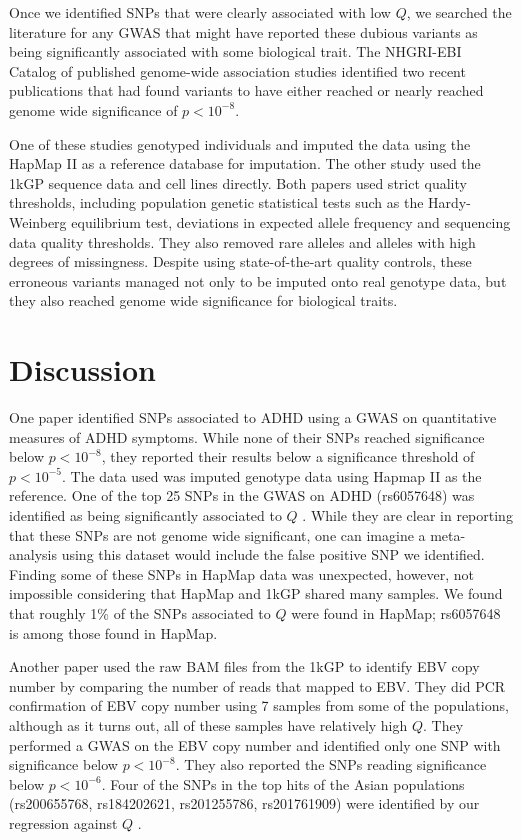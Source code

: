 \documentclass[9pt,lineno]{elife}
\begin{document}
Once we identified SNPs that were clearly associated with low $Q$, we searched the literature for any GWAS that might have reported these dubious variants as being significantly associated with some biological trait. 
The NHGRI-EBI Catalog of published genome-wide association studies identified two recent publications that had found variants to have either reached or nearly reached genome wide significance of $ p < 10^{-8}$.

One of these studies genotyped individuals and imputed the data using the HapMap II as a reference  database for imputation.
The other study used the 1kGP sequence data and cell lines directly.
Both papers used strict quality thresholds, including population genetic statistical tests such as the Hardy-Weinberg equilibrium test, deviations in expected allele frequency and sequencing data quality thresholds. 
They also removed rare alleles and alleles with high degrees of missingness. 
Despite using state-of-the-art quality controls, these erroneous variants managed not only to be imputed onto real genotype data, but they also reached genome wide significance for biological traits.

\section{Discussion}
One paper identified SNPs associated to ADHD using a GWAS on quantitative measures of ADHD symptoms.
While none of their SNPs reached significance below $ p < 10^{-8}$, they reported their results below a significance threshold of $ p < 10^{-5}$.
The data used was imputed genotype data using Hapmap II as the reference.
One of the top 25 SNPs in the GWAS on ADHD (rs6057648) was identified as being significantly associated to $Q$ \citep{Ebejer2013}.
While they are clear in reporting that these SNPs are not genome wide significant, one can imagine a meta-analysis using this dataset would include the false positive SNP we identified.
Finding some of these SNPs in HapMap data was unexpected, however, not impossible considering that HapMap and 1kGP shared many samples.
We found that roughly 1\% of the SNPs associated to $Q$ were found in HapMap; rs6057648 is among those found in HapMap.

Another paper used the raw BAM files from the 1kGP to identify EBV copy number by comparing the number of reads that mapped to EBV.
They did PCR confirmation of EBV copy number using 7 samples from some of the populations, although as it turns out, all of these samples have relatively high $Q$.
They performed a GWAS on the EBV copy number and identified only one SNP with significance below $ p < 10^{-8}$. 
They also reported the SNPs reading significance below $ p < 10^{-6}$. 
Four of the SNPs in the top hits of the Asian populations (rs200655768, rs184202621, rs201255786, rs201761909) were identified by our regression against $Q$ \citep{Mandage2017}.
\end{document}
